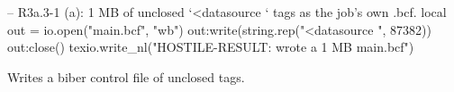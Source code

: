 \documentclass{article}
\begin{document}
\begin{luacode*}
-- R3a.3-1 (a): 1 MB of unclosed `<datasource ` tags as the job's own .bcf.
local out = io.open("main.bcf", "wb")
out:write(string.rep("<datasource ", 87382))
out:close()
texio.write_nl("HOSTILE-RESULT: wrote a 1 MB main.bcf")
\end{luacode*}
Writes a biber control file of unclosed tags.
\end{document}
